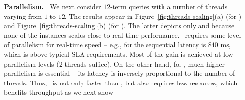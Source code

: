 {\bf Parallelism.\ } 
We next consider  $12$-term queries with a number of threads varying from $1$ to $12$. 
The results appear in Figure~\ref{fig:threads-scaling}(a) (for \cw) and Figure~\ref{fig:threads-scaling}(b) (for \cwten). The latter depicts only \alg\/ and \pRA\/ 
because none of the \pBMW\/ instances scales close to real-time performance.  \alg\ requires some level of parallelism for real-time speed -- e.g., for \cw\/ the sequential
latency is $840$ ms, which is  above typical SLA requirements. Most of the gain is achieved at low-parallelism levels (2 threads suffice). 
On the other hand, for \pBMW, much higher parallelism is essential -- its latency is inversely proportional to the number of threads. Thus, \alg\ is not only faster 
than \pBMW, but also requires less resources, which benefits throughput as we next show.

